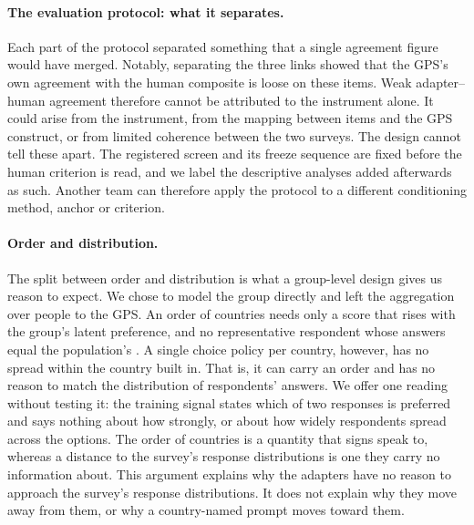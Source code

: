 \paragraph{The evaluation protocol: what it separates.} Each part of the protocol separated something that a single agreement figure would have merged. Notably, separating the three links showed that the GPS's own agreement with the human composite is loose on these items. Weak adapter--human agreement therefore cannot be attributed to the instrument alone. It could arise from the instrument, from the mapping between items and the GPS construct, or from limited coherence between the two surveys. The design cannot tell these apart. The registered screen and its freeze sequence are fixed before the human criterion is read, and we label the descriptive analyses added afterwards as such. Another team can therefore apply the protocol to a different conditioning method, anchor or criterion.

\paragraph{Order and distribution.} The split between order and distribution is what a group-level design gives us reason to expect. We chose to model the group directly and left the aggregation over people to the GPS. An order of countries needs only a score that rises with the group's latent preference, and no representative respondent whose answers equal the population's \citep{kirman1992}. A single choice policy per country, however, has no spread within the country built in. That is, it can carry an order and has no reason to match the distribution of respondents' answers. We offer one reading without testing it: the training signal states which of two responses is preferred and says nothing about how strongly, or about how widely respondents spread across the options. The order of countries is a quantity that signs speak to, whereas a distance to the survey's response distributions is one they carry no information about. This argument explains why the adapters have no reason to approach the survey's response distributions. It does not explain why they move away from them, or why a country-named prompt moves toward them.

